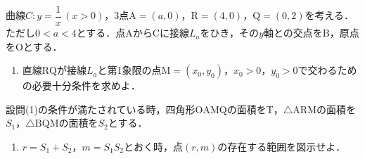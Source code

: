 \documentclass[../../main.tex]{subfiles}
\begin{document}
曲線$C:y=\dfrac{1}{x}\, (x>0)$，$3$点$\mathrm{A}=(a,0)$，$\mathrm{R}=(4,0)$，$\mathrm{Q}=(0,2)$を考える．ただし$0<a<4$とする．点$\mathrm{A}$から$\mathrm{C}$に接線$L_a$をひき，その$y$軸との交点を$\mathrm{B}$，原点を$\mathrm{O}$とする．
\begin{enumerate}
  \item 直線$\mathrm{RQ}$が接線$L_a$と第1象限の点$\mathrm{M}=(x_0,y_0)$，$x_0>0$，$y_0>0$で交わるための必要十分条件を求めよ．
\end{enumerate}
設問(1)の条件が満たされている時，四角形$\mathrm{OAMQ}$の面積を$\mathrm{T}$，$\triangle\mathrm{ARM}$の面積を$S_1$，$\triangle\mathrm{BQM}$の面積を$S_2$とする．
\begin{enumerate}
  \item[2] $r=S_1+S_2$，$m=S_1S_2$とおく時，点$(r,m)$の存在する範囲を図示せよ．
\end{enumerate}
\end{document}
